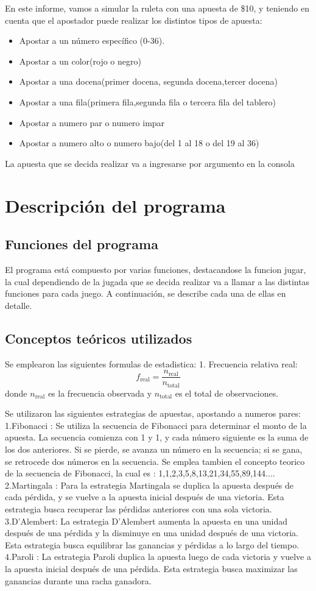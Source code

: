 \documentclass{article}
\begin{document}
En este informe, vamos a simular la ruleta con una apuesta de \$10, y teniendo en cuenta que el apostador puede realizar los distintos tipos de apuesta:
\begin{itemize}
    \item Apostar a un número específico (0-36).
    \item Apostar a un color(rojo o negro)
    \item Apostar a una docena(primer docena, segunda docena,tercer docena)
    \item Apostar a una fila(primera fila,segunda fila o tercera fila del tablero)
    \item Apostar a numero par o numero impar
    \item Apostar a numero alto o numero bajo(del 1 al 18 o del 19 al 36)
\end{itemize}
La apuesta que se decida realizar va a ingresarse por argumento en la consola
    
\section{Descripción del programa}
\subsection{Funciones del programa}
El programa está compuesto por varias funciones, destacandose la funcion jugar, la cual dependiendo de la jugada que se decida realizar va a llamar a las distintas funciones para cada juego. A continuación, se describe cada una de ellas en detalle.

\subsection{Conceptos teóricos utilizados}
Se emplearon las siguientes formulas de estadistica:
1. Frecuencia relativa real:
\[
f_{\text{real}} = \frac{n_{\text{real}}}{n_{\text{total}}}
\]
donde \( n_{\text{real}} \) es la frecuencia observada y \( n_{\text{total}} \) es el total de observaciones.

Se utilizaron las siguientes estrategias de apuestas, apostando a numeros pares:
1.Fibonacci : 
Se utiliza la secuencia de Fibonacci para determinar el monto de la apuesta. La secuencia comienza con 1 y 1, y cada número siguiente es la suma de los dos anteriores. Si se pierde, se avanza un número en la secuencia; si se gana, se retrocede dos números en la secuencia.
Se emplea tambien el concepto teorico de la secuencia de Fibonacci, la cual es : 1,1,2,3,5,8,13,21,34,55,89,144....
2.Martingala :
Para la estrategia Martingala se duplica la apuesta después de cada pérdida, y se vuelve a la apuesta inicial después de una victoria. Esta estrategia busca recuperar las pérdidas anteriores con una sola victoria.
3.D’Alembert:
La estrategia D'Alembert aumenta la apuesta en una unidad después de una pérdida y la disminuye en una unidad después de una victoria. Esta estrategia busca equilibrar las ganancias y pérdidas a lo largo del tiempo.
4.Paroli : 
La estrategia Paroli duplica la apuesta luego de cada victoria y vuelve a la apuesta inicial después de una pérdida. Esta estrategia busca maximizar las ganancias durante una racha ganadora.
\end{document}
